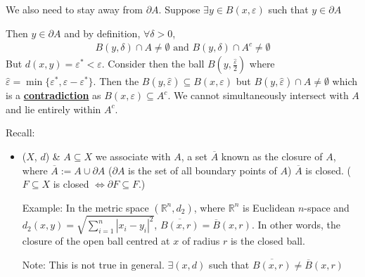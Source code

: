 \documentclass[10pt]{article}
\begin{document}
\begin{multicols}{2}
\begin{center}
\end{center}

\vspace*{13mm}

We also need to stay away from $\partial A$. Suppose $\exists y\in B(x,\varepsilon)$ such that $y\in\partial A$

Then $y\in\partial A$ and by definition, $\forall\delta>0$, 
\begin{align*}
    B(y,\delta)\cap A\neq\emptyset\text{ and }B(y,\delta)\cap A^{c}\neq\emptyset
\end{align*}
But $d(x,y)=\varepsilon^{*}<\varepsilon$. Consider then the ball $B(y,\frac{\hat{\varepsilon}}{2})$ where $\hat{\varepsilon}=\min\{\varepsilon^{*},\varepsilon-\varepsilon^{*}\}$. Then the $B(y,\hat{\varepsilon})\subseteq B(x,\varepsilon)$ but $B(y, \hat{\varepsilon})\cap A\neq\emptyset$ which is a \textbf{\underline{contradiction}} as $B(x,\varepsilon)\subseteq A^{c}$. We cannot simultaneously intersect with $A$ and lie entirely within $A^{c}$.
\end{multicols}

Recall:
\begin{itemize}[label=\empty]
    \item ($X$, $d$) \& $A\subseteq X$ we associate with $A$, a set $\overline{A}$ known as the closure of $A$, where
    \subitem $\overline{A}:=A\cup\partial A$ ($\partial A$ is the set of all boundary points of $A$)
    \subitem $\overline{A}$ is closed. ($F\subseteq X$ is closed $\iff\partial F\subseteq F$.)
\end{itemize}

\begin{itemize}
    \item[Example:] In the metric space $(\mathbb{R}^{n}, d_{2})$, where $\mathbb{R}^{n}$ is Euclidean $n$-space and $d_{2}(x,y)=\sqrt{\sum^{n}_{i=1}|x_{i}-y_{i}|^{2}}$,
    \subitem $\overline{B(x,r)}=\overline{B}(x,r)$. In other words, the closure of the open ball centred at $x$ of radius $r$ is the closed ball.
    \item[Note:] This is not true in general. $\exists (x,d)$ such that $\overline{B(x,r)}\neq\overline{B}(x,r)$
\end{itemize}
\end{document}
